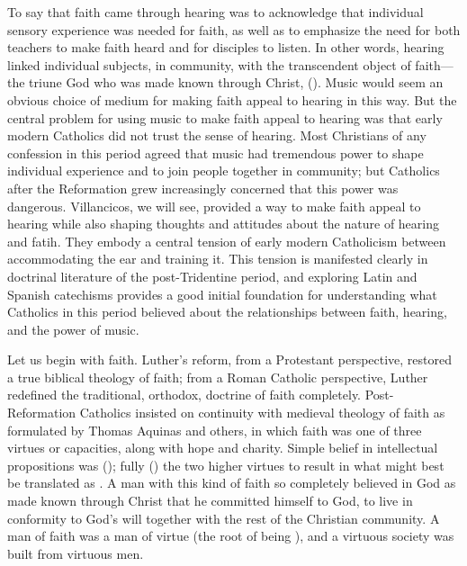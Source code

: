 To say that faith came through hearing was to acknowledge that individual sensory experience was needed for faith, as well as to emphasize the need for both teachers to make faith heard and for disciples to listen.
In other words, hearing linked individual subjects, in community, with the transcendent object of faith---the triune God who was made known through Christ,  ().
Music would seem an obvious choice of medium for making faith appeal to hearing in this way.
But the central problem for using music to make faith appeal to hearing was that early modern Catholics did not trust the sense of hearing.
Most Christians of any confession in this period agreed that music had tremendous power to shape individual experience and to join people together in community; but Catholics after the Reformation grew increasingly concerned that this power was dangerous.
Villancicos, we will see, provided a way to make faith appeal to hearing while also shaping thoughts and attitudes about the nature of hearing and fatih.
They embody a central tension of early modern Catholicism between accommodating the ear and training it.
This tension is manifested clearly in doctrinal literature of the post-Tridentine period, and exploring Latin and Spanish catechisms provides a good initial foundation for understanding what Catholics in this period believed about the relationships between faith, hearing, and the power of music.

Let us begin with faith.
Luther's reform, from a Protestant perspective, restored a true biblical theology of faith; from a Roman Catholic perspective, Luther redefined the traditional, orthodox, doctrine of faith completely.
Post-Reformation Catholics insisted on continuity with medieval theology of faith as formulated by Thomas Aquinas and others, in which faith was one of three virtues or capacities, along with hope and charity.
Simple belief in intellectual propositions was  (); fully  ()  the two higher virtues to result in what might best be translated as .
A man with this kind of faith so completely believed in God as made known through Christ that he committed himself to God, to live in conformity to God's will together with the rest of the Christian community.
A man of faith was a man of virtue (the root of  being ), and a virtuous society was built from virtuous men.%
\Autocite[8]{Catholic:Catechismus1614}

